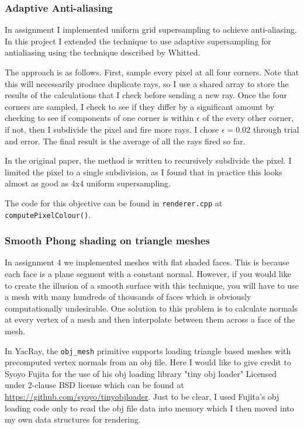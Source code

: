 \documentclass[12pt]{article}
\begin{document}
\subsubsection{Adaptive Anti-aliasing}
In assignment I implemented uniform grid supersampling to achieve anti-aliasing. In this project I extended the technique to use adaptive supersampling for antialiasing using the technique described by Whitted\cite{alias}.

The approach is as follows. First, sample every pixel at all four corners. Note that this will necessarily produce duplicate rays, so I use a shared array to store the results of the calculations that I check before sending a new ray. Once the four corners are sampled, I check to see if they differ by a significant amount by checking to see if components of one corner is within $\epsilon$ of the every other corner, if not, then I subdivide the pixel and fire more rays. I chose $\epsilon = 0.02$ through trial and error. The final result is the average of all the rays fired so far.

In the original paper, the method is written to recursively subdivide the pixel. I limited the pixel to a single subdivision, as I found that in practice this looks almost as good as 4x4 uniform supersampling.

The code for this objective can be found in \texttt{renderer.cpp} at \texttt{computePixelColour()}. 

\subsubsection{Smooth Phong shading on triangle meshes}

In assignment 4 we implemented meshes with flat shaded faces. This is because each face is a plane segment with a constant normal. However, if you would like to create the illusion of a smooth surface with this technique, you will have to use a mesh with many hundreds of thousands of faces which is obviously computationally undesirable. One solution to this problem is to calculate normals at every vertex of a mesh and then interpolate between them across a face of the mesh.

In YacRay, the \texttt{obj\_mesh} primitive supports loading triangle based meshes with precomputed vertex normals from an obj file. Here I would like to give credit to Syoyo Fujita for the use of his obj loading library "tiny obj loader" Licensed under 2-clause BSD license which can be found at \url{https://github.com/syoyo/tinyobjloader}. Just to be clear, I used Fujita's obj loading code only to read the obj file data into memory which I then moved into my own data structures for rendering. 
\end{document}
